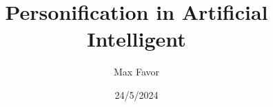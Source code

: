 \documentclass{article}
\title{Personification in Artificial Intelligent}
\author{Max Favor}
\date{24/5/2024}
\begin{document}
\maketitle

\abstract{

}
\tableofcontents













\printbibliography
\end{document}
